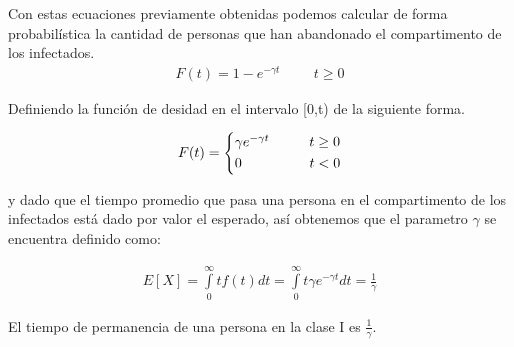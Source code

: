 Con estas ecuaciones previamente obtenidas podemos calcular de forma probabilística la cantidad de personas que han abandonado el compartimento de los infectados.
\begin{align}
F(t) = 1 -  e^{-\gamma t} \hspace{1cm} t \geq  0
\end{align}

Definiendo la función de desidad en el intervalo [0,t) de la siguiente forma.

\begin{equation*}
F(t) =
\begin{cases*}
\gamma e^{-\gamma t} \hspace{1cm} t \geq  0 \\
0 \hspace{1.7cm} t <  0
\end{cases*}
\end{equation*}

y dado que el tiempo promedio que pasa una persona en el compartimento de los infectados está dado por valor el esperado, así obtenemos que el parametro $\gamma$ se encuentra definido como:

\begin{align}
E[X] = \int \limits_{0}^{\infty} tf(t)dt = \int \limits_{0}^{\infty} t\gamma e^{-\gamma t} dt = \frac{1}{\gamma}
\end{align}

\begin{Af}
El tiempo de permanencia de una persona en la clase I es $\frac{1}{\gamma}$. \cite{Martcheva}
\end{Af}

